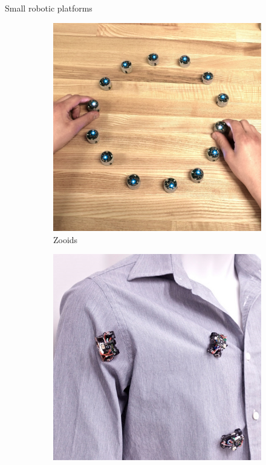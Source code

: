 \documentclass{beamer}
\begin{document}
\begin{frame}{Small robotic platforms}
	\begin{figure}
		\begin{subfigure}[b]{0.32\textwidth}
			\includegraphics[width=\textwidth]{pics/zooids.jpg}
			\caption*{Zooids}
		\end{subfigure}
		\begin{subfigure}[b]{0.324\textwidth}
			\includegraphics[width=\textwidth]{pics/rovables.jpg}

\end{subfigure}
\end{figure}
\end{frame}
\end{document}
